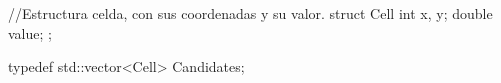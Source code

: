 //Estructura celda, con sus coordenadas y su valor.
struct Cell {
	int x, y;
	double value;
};

typedef std::vector<Cell> Candidates;
